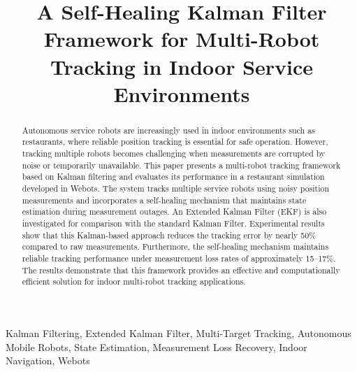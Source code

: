 \documentclass[conference]{IEEEtran}
\begin{document}
\title{A Self-Healing Kalman Filter Framework for Multi-Robot Tracking in Indoor Service Environments\\}

\author{
\and
{}
}

\maketitle

\begin{abstract}
Autonomous service robots are increasingly used in indoor environments such as restaurants, where reliable position tracking is essential for safe operation. However, tracking multiple robots becomes challenging when measurements are corrupted by noise or temporarily unavailable. This paper presents a multi-robot tracking framework based on Kalman filtering and evaluates its performance in a restaurant simulation developed in Webots. The system tracks multiple service robots using noisy position measurements and incorporates a self-healing mechanism that maintains state estimation during measurement outages. An Extended Kalman Filter (EKF) is also investigated for comparison with the standard Kalman Filter. Experimental results show that this Kalman-based approach reduces the tracking error by nearly 50\% compared to raw measurements. Furthermore, the self-healing mechanism maintains reliable tracking performance under measurement loss rates of approximately 15--17\%. The results demonstrate that this framework provides an effective and computationally efficient solution for indoor multi-robot tracking applications.
\end{abstract}

\begin{IEEEkeywords}
Kalman Filtering, Extended Kalman Filter, Multi-Target Tracking, Autonomous Mobile Robots, State Estimation, Measurement Loss Recovery, Indoor Navigation, Webots
\end{IEEEkeywords}
\end{document}
